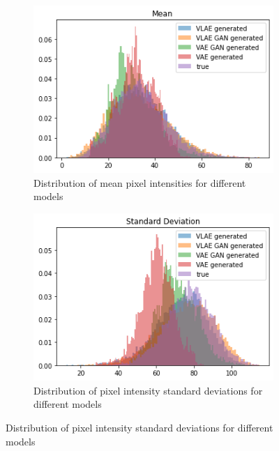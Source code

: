 \begin{figure}
    \centering
    \begin{subfigure}{0.48\textwidth}
        \centering
        \includegraphics[width=\textwidth]{images/generated_vs_true/mnist/mnist_vs_models_mean.png}
        \caption{Distribution of mean pixel intensities for different models}
        \label{subfig:mean_generated_vs_true}
    \end{subfigure}
    \hfill
    \begin{subfigure}{0.48\textwidth}
        \centering
        \includegraphics[width=\textwidth]{images/generated_vs_true/mnist/mnist_vs_models_sd.png}
        \caption{Distribution of pixel intensity standard deviations for different models}
        \label{subfig:sd_generated_vs_true}
    \end{subfigure}

\end{figure}
